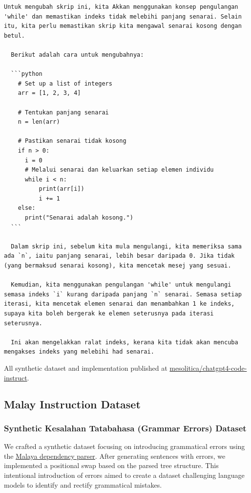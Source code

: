 \documentclass{article}
\begin{document}
\begin{lstlisting}[breaklines=true]
  Untuk mengubah skrip ini, kita Akkan menggunakan konsep pengulangan 'while' dan memastikan indeks tidak melebihi panjang senarai. Selain itu, kita perlu memastikan skrip kita mengawal senarai kosong dengan betul.

  Berikut adalah cara untuk mengubahnya:

  ```python
    # Set up a list of integers
    arr = [1, 2, 3, 4]

    # Tentukan panjang senarai
    n = len(arr)

    # Pastikan senarai tidak kosong
    if n > 0:
      i = 0
      # Melalui senarai dan keluarkan setiap elemen individu
      while i < n:
          print(arr[i])
          i += 1
    else:
      print("Senarai adalah kosong.")
  ```

  Dalam skrip ini, sebelum kita mula mengulangi, kita memeriksa sama ada `n`, iaitu panjang senarai, lebih besar daripada 0. Jika tidak (yang bermaksud senarai kosong), kita mencetak mesej yang sesuai.

  Kemudian, kita menggunakan pengulangan 'while' untuk mengulangi semasa indeks `i` kurang daripada panjang `n` senarai. Semasa setiap iterasi, kita mencetak elemen senarai dan menambahkan 1 ke indeks, supaya kita boleh bergerak ke elemen seterusnya pada iterasi seterusnya.

  Ini akan mengelakkan ralat indeks, kerana kita tidak akan mencuba mengakses indeks yang melebihi had senarai.
\end{lstlisting}

All synthetic dataset and implementation published at \href{https://huggingface.co/datasets/mesolitica/chatgpt4-code-instruct}{mesolitica/chatgpt4-code-instruct}.

\subsection{Malay Instruction Dataset}

\subsubsection{Synthetic Kesalahan Tatabahasa (Grammar Errors) Dataset}

We crafted a synthetic dataset focusing on introducing grammatical errors using the \href{https://malaya.readthedocs.io/en/stable/load-dependency.html}{Malaya dependency parser}. After generating sentences with errors, we implemented a positional swap based on the parsed tree structure. This intentional introduction of errors aimed to create a dataset challenging language models to identify and rectify grammatical mistakes.
\end{document}
